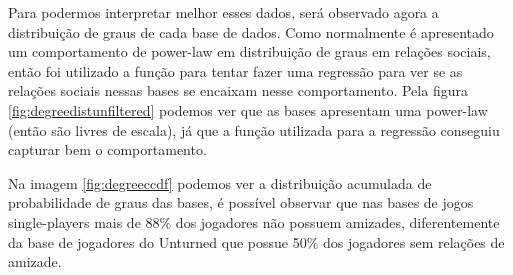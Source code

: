 \documentclass[12pt]{article}
\begin{document}
Para podermos interpretar melhor esses dados, será observado agora a distribuição de graus de cada base de dados. Como normalmente é apresentado um comportamento de power-law em distribuição de graus em relações sociais, então foi utilizado a função para tentar fazer uma regressão para ver se as relações sociais nessas bases se encaixam nesse comportamento. Pela figura \ref{fig:degreedistunfiltered} podemos ver que as bases apresentam uma power-law (então são livres de escala), já que a função utilizada para a regressão conseguiu capturar bem o comportamento.



Na imagem \ref{fig:degreeccdf} podemos ver a distribuição acumulada de probabilidade de graus das bases, é possível observar que nas bases de jogos single-players mais de 88\% dos jogadores não possuem amizades, diferentemente da base de jogadores do Unturned que possue 50\% dos jogadores sem relações de amizade.
\end{document}
